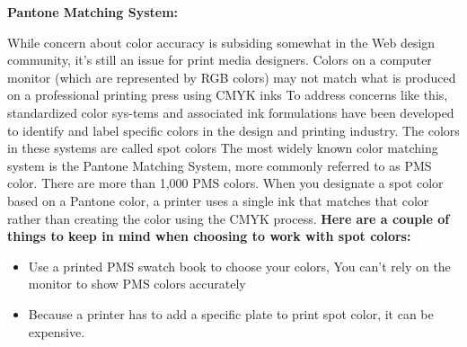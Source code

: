 \documentclass{report}
\begin{document}
          \bigbreak \noindent \bigbreak \noindent 
          \begin{large}
            \textbf{Pantone Matching System:}
          \end{large}
          \bigbreak \noindent 
          While concern about color accuracy is subsiding somewhat in the Web design community, it’s still an issue for print media designers. Colors on a computer monitor (which are represented by RGB colors) may not match what is produced on a professional printing press using CMYK inks
          \bigbreak \noindent 
          To address concerns like this, standardized color sys-tems and associated ink formulations have been developed to identify and label specific colors in the design and printing industry. The colors in these systems are called spot colors
          \bigbreak \noindent 
          The most widely known color matching system is the Pantone Matching System, more commonly referred to as PMS color. There are more than 1,000 PMS colors. When you designate a spot color based on a Pantone color, a printer uses a single ink that matches that color rather than creating the color using the CMYK process.
          \bigbreak \noindent 
          \textbf{ Here are a couple of things to keep in mind when choosing to work with spot colors:}
          \begin{itemize}
            \item Use a printed PMS swatch book to choose your colors, You can’t rely on the monitor to show PMS colors accurately
            \item Because a printer has to add a specific plate to print spot color, it can be expensive.
          \end{itemize}


     
\end{document}
